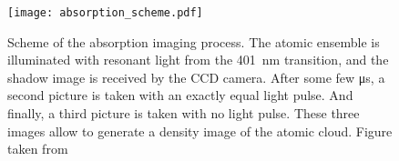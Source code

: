\begin{figure}[!htbp]\centering
	\texttt{[image: absorption\_scheme.pdf]}
	\caption[Scheme of the absorption imaging process]{Scheme of the absorption imaging process. The atomic ensemble is illuminated with resonant light from the \SI{401}{\nano\meter} transition, and the shadow image is received by the CCD camera. After some few \si{\micro\second}, a second picture is taken with an exactly equal light pulse. And finally, a third picture is taken with no light pulse. These three images allow to generate a density image of the atomic cloud. Figure taken from \cite{Brammer2016}}\label{fig:absorption_scheme}
\end{figure}



